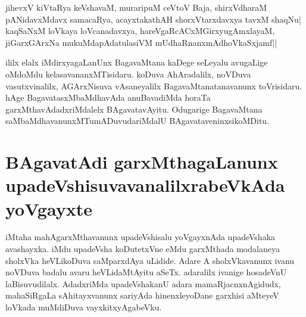 \begin{shloka}
jihevxV kiVtaRya keVshavaM, muraripuM ceVtoV Baja, shirxVdharaM\label{271}\\
pANidavxMdavx samacaRya, acayxtakathAH shorxVtarxdavxya tavxM shaqNu|\\
kaqSaNxM loVkaya loVcanadavxya, hareVgaRcACxMGirxyugAmxlayaM,\\
jiGarxGArxNa mukuMdapAdatulasiVM mUdhaRnanxmAdhoVkaSxjamf||
\end{shloka}

ililx elalx iMdirxyagaLanUnx BagavaMtana kaDege seLeyalu avugaLige oMdoMdu kelasavananxMTisidaru. koDuva AhAradalilx, noVDuva vasutxvinalilx, AGArxNisuva vAsaneyalilx BagavaMtanatanavanunx toVrisidaru. hAge BagavatasxMbaMdhavAda anuBavadiMda horaTa garxMthavAdadxriMdalelx BAgavatavAyitu. Odugarige BagavaMtana saMbaMdhavanunxMTumADuvudariMdalU BAgavataveninxsikoMDitu.

\section*{BAgavatAdi garxMthagaLanunx upadeVshisuvavanalilxrabeVkAda yoVgayxte}

iMtaha mahAgarxMthavanunx upadeVshisalu yoVgayxnAda upadeVshaka avashayxka. iMdu upadeVsha koDutetxVne eMdu garxMthada modalaneya sholxVka heVLikoDuva saMparxdAya uLidide. Adare A sholxVkavanunx ivanu noVDuva badalu avaru heVLidaMtAyitu aSeTx. adaralilx ivanige hosadeVnU laBisuvudilalx. AdadxriMda upadeVshakanU adara mamaRjacnxnAgidudx, mahaSiRgaLa sAhitayxvanunx sariyAda hinenxleyoDane garxhisi aMteyeV loVkada muMdiDuva vayxkitxyAgabeVku.
